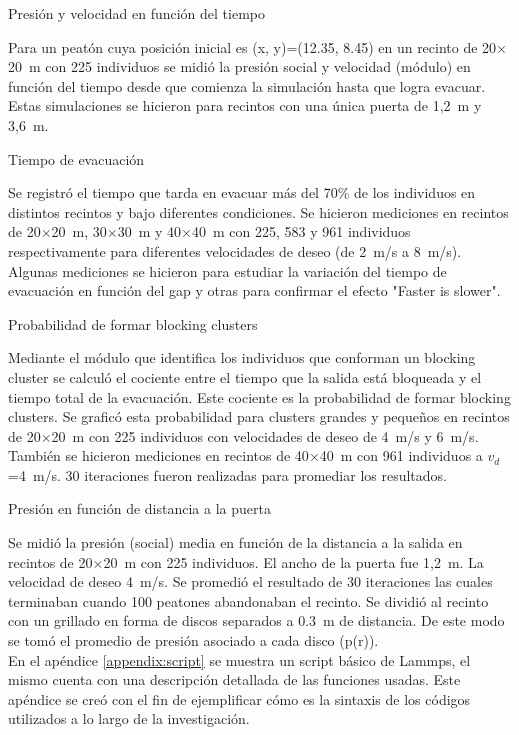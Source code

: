 {\Large Presión y velocidad en función del tiempo}

Para un peatón cuya posición inicial es (x, y)=(12.35, 8.45) en un recinto de 20$\times$20~m con 225 individuos se midió la presión social y velocidad (módulo) en función del tiempo desde que comienza la simulación hasta que logra evacuar. Estas simulaciones se hicieron para recintos con una única puerta de 1,2~m y 3,6~m. 

{\Large Tiempo de evacuación}

Se registró el tiempo que tarda en evacuar más del 70\% de los individuos en distintos recintos y bajo diferentes condiciones. Se hicieron mediciones en recintos de 20$\times$20~m, 30$\times$30~m y 40$\times$40~m con 225, 583 y 961 individuos respectivamente para diferentes velocidades de deseo (de 2~m/s a 8~m/s). Algunas mediciones se hicieron para estudiar la variación del tiempo de evacuación en función del gap y otras para confirmar el efecto "Faster is slower". 

{\Large Probabilidad de formar blocking clusters}

Mediante el módulo que identifica los individuos que conforman un blocking cluster se calculó el cociente entre el tiempo que la salida está bloqueada y el tiempo total de la evacuación. Este cociente es la probabilidad de formar blocking clusters. Se graficó esta probabilidad para clusters grandes y pequeños en recintos de 20$\times$20~m con 225 individuos con velocidades de deseo de 4~m/s y 6~m/s. También se hicieron mediciones en recintos de 40$\times$40~m con 961 individuos a $v_d$=4~m/s. 30 iteraciones fueron realizadas para promediar los resultados. 

{\Large Presión en función de distancia a la puerta}

Se midió la presión (social) media en función de la distancia a la salida en recintos de 20$\times$20~m con 225 individuos. El ancho de la puerta fue 1,2~m. La velocidad de deseo 4~m/s. Se promedió el resultado de 30 iteraciones las cuales terminaban cuando 100 peatones abandonaban el recinto. Se dividió al recinto con un grillado en forma de discos separados a 0.3~m de distancia. De este modo se tomó el promedio de presión asociado a cada disco (p(r)). \\

En el apéndice \ref{appendix:script} se muestra un script básico de Lammps, el mismo cuenta con una descripción detallada de las funciones usadas. Este apéndice se creó con el fin de ejemplificar cómo es la sintaxis de los códigos utilizados a lo largo de la investigación. 


